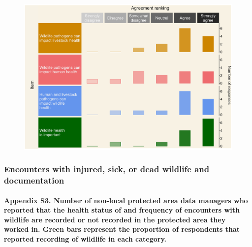 \documentclass[
  letterpaper,
  DIV=11,
  numbers=noendperiod]{scrartcl}
\let\oldparagraph\paragraph
\renewcommand{\paragraph}[1]{\oldparagraph{#1}\mbox{}}
\begin{document}
\begin{figure}[H]

{\centering \includegraphics[width=6.25in,height=\textheight]{plots/appedix_plot_1.png}

}

\end{figure}

\hypertarget{encounters-with-injured-sick-or-dead-wildlife-and-documentation}{%
\subsubsection{Encounters with injured, sick, or dead wildlife and
documentation}\label{encounters-with-injured-sick-or-dead-wildlife-and-documentation}}

\hypertarget{appendix-s3.-number-of-non-local-protected-area-data-managers-who-reported-that-the-health-status-of-and-frequency-of-encounters-with-wildlife-are-recorded-or-not-recorded-in-the-protected-area-they-worked-in.-green-bars-represent-the-proportion-of-respondents-that-reported-recording-of-wildlife-in-each-category.}{%
\paragraph{Appendix S3. Number of non-local protected area data managers
who reported that the health status of and frequency of encounters with
wildlife are recorded or not recorded in the protected area they worked
in. Green bars represent the proportion of respondents that reported
recording of wildlife in each
category.}\label{appendix-s3.-number-of-non-local-protected-area-data-managers-who-reported-that-the-health-status-of-and-frequency-of-encounters-with-wildlife-are-recorded-or-not-recorded-in-the-protected-area-they-worked-in.-green-bars-represent-the-proportion-of-respondents-that-reported-recording-of-wildlife-in-each-category.}}
\end{document}
